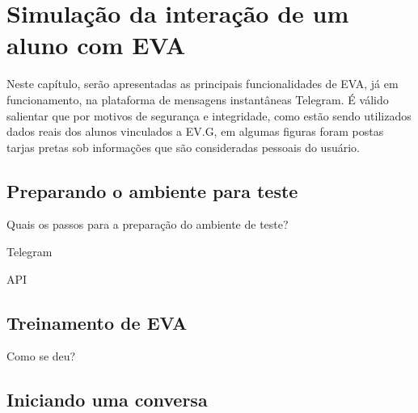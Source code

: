 %
%
%
%

\chapter{Simulação da interação de um aluno com EVA}

Neste capítulo, serão apresentadas as principais funcionalidades de EVA, já em funcionamento, na plataforma de mensagens instantâneas Telegram. É válido salientar que por motivos de segurança e integridade, como estão sendo utilizados dados reais dos alunos vinculados a EV.G, em algumas figuras foram postas tarjas pretas sob informações que são consideradas pessoais do usuário.

\section{Preparando o ambiente para teste}

Quais os passos para a preparação do ambiente de teste?

Telegram

API


\section{Treinamento de EVA}

Como se deu?


\section{Iniciando uma conversa}

